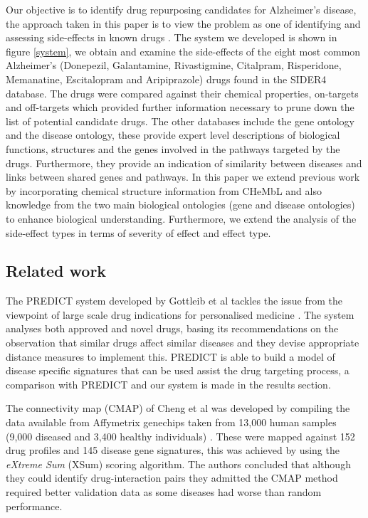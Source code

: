 \documentclass[preprint,11pt]{elsarticle}
\begin{document}
Our objective  is to identify drug repurposing candidates for Alzheimer's disease, the approach taken in this paper is to view the problem as one of identifying and assessing side-effects in known drugs \cite{McGarry2015a,Kuhn2010}.  The system we developed is shown in figure \ref{system}, we obtain and examine the side-effects of the eight most common Alzheimer's (Donepezil, Galantamine, Rivastigmine, Citalpram, Risperidone, Memanatine, Escitalopram and Aripiprazole) drugs found in the SIDER4 database. The drugs were compared against their chemical properties, on-targets and off-targets which provided further information necessary to prune down the list of potential candidate drugs. The other databases include the gene ontology and the disease ontology, these provide expert level descriptions of biological functions, structures and the genes involved in the pathways targeted by the drugs.  Furthermore, they provide an indication of similarity between diseases and links between shared genes and pathways. In this paper we extend previous work by incorporating chemical structure information from CHeMbL and also knowledge from the two main biological ontologies (gene and disease ontologies) to enhance biological understanding. Furthermore, we extend the analysis of the side-effect types in terms of severity of effect and effect type.

\subsection{Related work}
The PREDICT system developed by Gottleib et al  tackles the issue from the viewpoint of large scale drug indications for personalised medicine \cite{Gottlieb2011}. The system analyses both approved and novel drugs, basing its recommendations on the observation that similar drugs affect similar diseases and they devise appropriate distance measures to implement this. PREDICT is able to build a model of disease specific signatures that can be used assist the drug targeting process, a comparison with PREDICT and our system is made in the results section.

The connectivity map (CMAP) of Cheng et al was developed by compiling the data available from Affymetrix genechips taken from 13,000 human samples (9,000 diseased and 3,400 healthy individuals) \cite{Cheng2014}. These were mapped against 152 drug profiles and 145 disease gene signatures, this was achieved by using the {\it eXtreme Sum} (XSum) scoring algorithm. The authors concluded that although they could identify drug-interaction pairs they admitted the CMAP method required better validation data as some diseases had worse than random performance.
\end{document}
